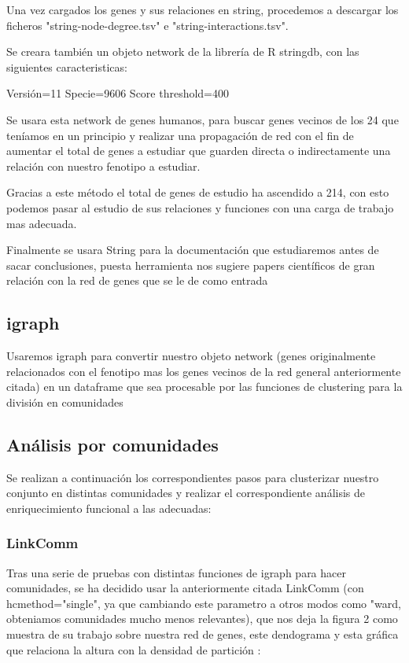 Una vez cargados los genes y sus relaciones en string, procedemos a descargar los ficheros "string-node-degree.tsv" e "string-interactions.tsv".

Se creara también un objeto network de la librería de R stringdb, con las siguientes caracteristicas:

Versión=11
Specie=9606
Score threshold=400

\hfill

Se usara esta network de genes humanos, para buscar genes vecinos de los 24 que teníamos en un principio y realizar una propagación de red con el fin de aumentar el total de genes a estudiar que guarden directa o indirectamente una relación con nuestro fenotipo a estudiar.

\hfill

Gracias a este método el total de genes de estudio ha ascendido a 214, con esto podemos pasar al estudio de sus relaciones y funciones con una carga de trabajo mas adecuada.

Finalmente se usara String para la documentación que estudiaremos antes de sacar conclusiones, puesta herramienta nos sugiere papers científicos de gran relación con la red de genes que se le de como entrada

\subsection{igraph}

Usaremos igraph para convertir nuestro objeto network (genes originalmente relacionados con el  fenotipo mas los genes vecinos de la red general anteriormente citada) en un dataframe que sea procesable por las funciones de clustering para la división en comunidades

\hfill

\subsection{Análisis por comunidades}

Se realizan a continuación los correspondientes pasos para clusterizar nuestro conjunto en distintas comunidades y realizar el correspondiente análisis de enriquecimiento funcional a las adecuadas:

\subsubsection{LinkComm}

Tras una serie de pruebas con distintas funciones de igraph para hacer comunidades, se ha decidido usar la anteriormente citada LinkComm (con hcmethod="single", ya que cambiando este parametro a otros modos como "ward, obteniamos comunidades mucho menos relevantes), que nos deja la figura 2 como muestra de su trabajo sobre nuestra red de genes, este dendograma y esta gráfica que relaciona la altura con la densidad de partición :

